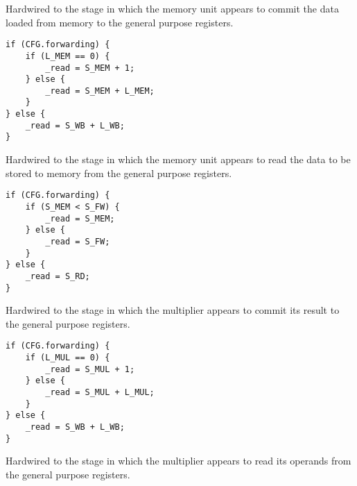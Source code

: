 Hardwired to the stage in which the memory unit appears to commit the data
loaded from memory to the general purpose registers.

\reset{****}
\implementation{}
\begin{lstlisting}
if (CFG.forwarding) {
    if (L_MEM == 0) {
        _read = S_MEM + 1;
    } else {
        _read = S_MEM + L_MEM;
    }
} else {
    _read = S_WB + L_WB;
}
\end{lstlisting}

Hardwired to the stage in which the memory unit appears to read the data to be
stored to memory from the general purpose registers.

\reset{****}
\implementation{}
\begin{lstlisting}
if (CFG.forwarding) {
    if (S_MEM < S_FW) {
        _read = S_MEM;
    } else {
        _read = S_FW;
    }
} else {
    _read = S_RD;
}
\end{lstlisting}

Hardwired to the stage in which the multiplier appears to commit its result to
the general purpose registers.

\reset{****}
\implementation{}
\begin{lstlisting}
if (CFG.forwarding) {
    if (L_MUL == 0) {
        _read = S_MUL + 1;
    } else {
        _read = S_MUL + L_MUL;
    }
} else {
    _read = S_WB + L_WB;
}
\end{lstlisting}

Hardwired to the stage in which the multiplier appears to read its operands from
the general purpose registers.

